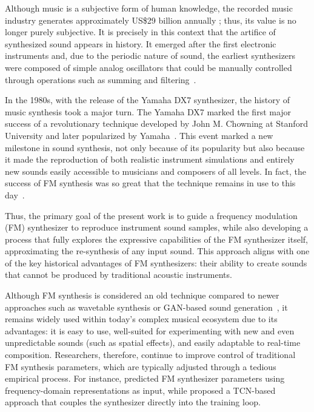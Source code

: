 \documentclass[10pt,conference]{IEEEtran}
\begin{document}
Although music is a subjective form of human knowledge, the recorded music industry generates approximately US\$29 billion annually \cite{ifpi2025}; thus, its value is no longer purely subjective. It is precisely in this context that the artifice of synthesized sound appears in history. It emerged after the first electronic instruments and, due to the periodic nature of sound, the earliest synthesizers were composed of simple analog oscillators that could be manually controlled through operations such as summing and filtering~\cite{holmes2016electronic}.

In the 1980s, with the release of the Yamaha DX7 synthesizer, the history of music synthesis took a major turn. The Yamaha DX7 marked the first major success of a revolutionary technique developed by John M. Chowning at Stanford University and later popularized by Yamaha~\cite{claesson2021resynthesis}. This event marked a new milestone in sound synthesis, not only because of its popularity but also because it made the reproduction of both realistic instrument simulations and entirely new sounds easily accessible to musicians and composers of all levels. In fact, the success of FM synthesis was so great that the technique remains in use to this day~\cite{holmes2016electronic}.

Thus, the primary goal of the present work is to guide a frequency modulation (FM) synthesizer to reproduce instrument sound samples, while also developing a process that fully explores the expressive capabilities of the FM synthesizer itself, approximating the re-synthesis of any input sound. This approach aligns with one of the key historical advantages of FM synthesizers: their ability to create sounds that cannot be produced by traditional acoustic instruments.

Although FM synthesis is considered an old technique compared to newer approaches such as wavetable synthesis or GAN-based sound generation~\cite{WaveGAN,SpecGAN,ZHANG2025368}, it remains widely used within today’s complex musical ecosystem due to its advantages: it is easy to use, well-suited for experimenting with new and even unpredictable sounds (such as spatial effects), and easily adaptable to real-time composition. Researchers, therefore, continue to improve control of traditional FM synthesis parameters, which are typically adjusted through a tedious empirical process. For instance, \cite{claesson2021resynthesis} predicted FM synthesizer parameters using frequency-domain representations as input, while \cite{steinmetz2022ddx7} proposed a TCN-based approach that couples the synthesizer directly into the training loop.
\end{document}
